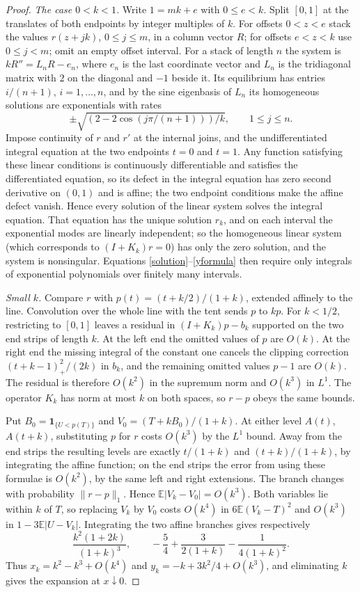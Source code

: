 \documentclass[11pt,a4paper]{article}
\theoremstyle{remark}
\newcommand{\E}{\mathbb E}
\newcommand{\1}{\mathbf 1}
\begin{document}
\begin{proof}
\emph{The case $0<k<1$.} Write $1=mk+e$ with $0\le e<k$. Split $[0,1]$ at the translates of both endpoints by integer multiples of $k$. For offsets $0<z<e$ stack the values $r(z+jk)$, $0\le j\le m$, in a column vector $R$; for offsets $e<z<k$ use $0\le j<m$; omit an empty offset interval. For a stack of length $n$ the system is $kR''=L_nR-e_n$, where $e_n$ is the last coordinate vector and $L_n$ is the tridiagonal matrix with $2$ on the diagonal and $-1$ beside it. Its equilibrium has entries $i/(n+1)$, $i=1,\ldots,n$, and by the sine eigenbasis of $L_n$ its homogeneous solutions are exponentials with rates
\[
 \pm\sqrt{(2-2\cos(j\pi/(n+1)))/k},\qquad 1\le j\le n.
\]
Impose continuity of $r$ and $r'$ at the internal joins, and the undifferentiated integral equation at the two endpoints $t=0$ and $t=1$. Any function satisfying these linear conditions is continuously differentiable and satisfies the differentiated equation, so its defect in the integral equation has zero second derivative on $(0,1)$ and is affine; the two endpoint conditions make the affine defect vanish. Hence every solution of the linear system solves the integral equation. That equation has the unique solution $r_k$, and on each interval the exponential modes are linearly independent; so the homogeneous linear system (which corresponds to $(I+K_k)r=0$) has only the zero solution, and the system is nonsingular. Equations \eqref{solution}--\eqref{yformula} then require only integrals of exponential polynomials over finitely many intervals.

\emph{Small $k$.} Compare $r$ with $p(t)=(t+k/2)/(1+k)$, extended affinely to the line. Convolution over the whole line with the tent sends $p$ to $kp$. For $k<1/2$, restricting to $[0,1]$ leaves a residual in $(I+K_k)p-b_k$ supported on the two end strips of length $k$. At the left end the omitted values of $p$ are $O(k)$. At the right end the missing integral of the constant one cancels the clipping correction $(t+k-1)_+^2/(2k)$ in $b_k$, and the remaining omitted values $p-1$ are $O(k)$. The residual is therefore $O(k^2)$ in the supremum norm and $O(k^3)$ in $L^1$. The operator $K_k$ has norm at most $k$ on both spaces, so $r-p$ obeys the same bounds.

Put $B_0=\1_{\{U<p(T)\}}$ and $V_0=(T+kB_0)/(1+k)$. At either level $A(t)$, $A(t+k)$, substituting $p$ for $r$ costs $O(k^3)$ by the $L^1$ bound. Away from the end strips the resulting levels are exactly $t/(1+k)$ and $(t+k)/(1+k)$, by integrating the affine function; on the end strips the error from using these formulae is $O(k^2)$, by the same left and right extensions. The branch changes with probability $\|r-p\|_1$. Hence $\E|V_k-V_0|=O(k^3)$. Both variables lie within $k$ of $T$, so replacing $V_k$ by $V_0$ costs $O(k^4)$ in $6\E(V_k-T)^2$ and $O(k^3)$ in $1-3\E|U-V_k|$. Integrating the two affine branches gives respectively
\[
 \frac{k^2(1+2k)}{(1+k)^3},\qquad
 -\frac54+\frac{3}{2(1+k)}-\frac{1}{4(1+k)^2}.
\]
Thus $x_k=k^2-k^3+O(k^4)$ and $y_k=-k+3k^2/4+O(k^3)$, and eliminating $k$ gives the expansion at $x\downarrow0$.
\end{proof}
\end{document}
